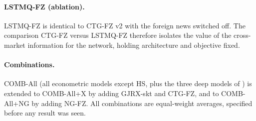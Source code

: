 \paragraph{LSTMQ-FZ (ablation).} LSTMQ-FZ is identical to CTG-FZ v2 with the foreign news switched off. The comparison CTG-FZ versus LSTMQ-FZ therefore isolates the value of the cross-market information for the network, holding architecture and objective fixed.

\paragraph{Combinations.} COMB-All (all econometric models except HS, plus the three deep models of \citealp{agrawal2026learning}) is extended to COMB-All+X by adding GJRX-skt and CTG-FZ, and to COMB-All+NG by adding NG-FZ. All combinations are equal-weight averages, specified before any result was seen.
